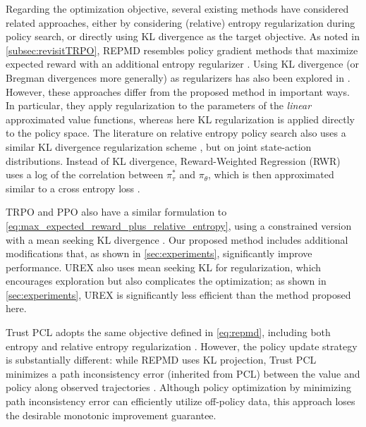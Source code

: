 Regarding the optimization objective,
several existing methods have considered related approaches,
either by considering (relative) entropy regularization during policy search,
or directly using KL divergence as the target objective. 
As noted in \cref{subsec:revisitTRPO},
REPMD resembles policy gradient methods that maximize expected reward
with an additional entropy regularizer
\citep{williams1991function,fox2015taming,nachum2017bridging}.
Using KL divergence (or Bregman divergences more generally)
as regularizers has also been explored
in \citet{liu2015finite,thomas2013projected,mahadevan2012sparse}.
However, these approaches differ from the proposed method
in important ways.
In particular, they apply regularization to the parameters of the
\emph{linear} approximated value functions, whereas here KL regularization
is applied directly to the policy space.
The literature on relative entropy policy search also uses a similar
KL divergence regularization scheme
\citep{peters2010relative,van2015learning},
but on joint state-action distributions.
Instead of KL divergence, Reward-Weighted Regression (RWR) uses
a log of the correlation between $\pi^*_\tau$ and $\pi_\theta$,
which is then approximated similar to a cross entropy loss
\citep{peters2007reinforcement,wierstra2008episodic}.

TRPO and PPO also have a similar formulation to
\cref{eq:max_expected_reward_plus_relative_entropy},
using a constrained version with a mean seeking KL divergence
\cite{schulman2015trust,schulman2017proximal}. 
Our proposed method includes additional modifications that,
as shown in \cref{sec:experiments}, significantly improve performance.
UREX also uses mean seeking KL for regularization,
which encourages exploration but also complicates the optimization;
as shown in \cref{sec:experiments},
UREX is significantly less efficient than the method proposed here.

Trust PCL adopts the same objective defined in \cref{eq:repmd},
including both entropy and relative entropy regularization
\citep{nachum2017trust}.
However, the policy update strategy is substantially different:
while REPMD uses KL projection, Trust PCL
minimizes a path inconsistency error (inherited from PCL)
between the value and policy along observed trajectories
\citep{nachum2017bridging}.
Although policy optimization by minimizing path inconsistency error
can efficiently utilize off-policy data, this approach loses the 
desirable monotonic improvement guarantee.

